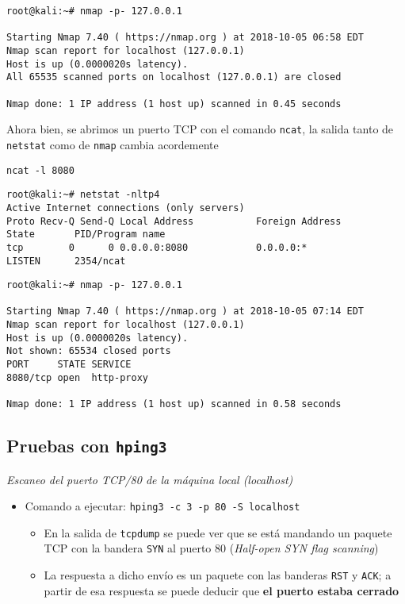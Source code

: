 \begin{lstlisting}[title={Escaneo de los 65535 puertos disponibles}]
root@kali:~# nmap -p- 127.0.0.1

Starting Nmap 7.40 ( https://nmap.org ) at 2018-10-05 06:58 EDT
Nmap scan report for localhost (127.0.0.1)
Host is up (0.0000020s latency).
All 65535 scanned ports on localhost (127.0.0.1) are closed

Nmap done: 1 IP address (1 host up) scanned in 0.45 seconds
\end{lstlisting}

Ahora bien, se abrimos un puerto TCP con el comando \texttt{ncat}, la salida tanto de \texttt{netstat} como de \texttt{nmap} cambia acordemente   

\begin{lstlisting}[title={Ponemos a escuchar al puerto 8080 por conexiones TCP}]
ncat -l 8080 
\end{lstlisting}

\begin{lstlisting}[title={\texttt{netstat} indica un puerto abierto}]
root@kali:~# netstat -nltp4
Active Internet connections (only servers)
Proto Recv-Q Send-Q Local Address           Foreign Address         State       PID/Program name    
tcp        0      0 0.0.0.0:8080            0.0.0.0:*               LISTEN      2354/ncat
\end{lstlisting}

\begin{lstlisting}[title={\texttt{nmap} indica 65534 puertos cerrados, y uno abierto}]
root@kali:~# nmap -p- 127.0.0.1

Starting Nmap 7.40 ( https://nmap.org ) at 2018-10-05 07:14 EDT
Nmap scan report for localhost (127.0.0.1)
Host is up (0.0000020s latency).
Not shown: 65534 closed ports
PORT     STATE SERVICE
8080/tcp open  http-proxy

Nmap done: 1 IP address (1 host up) scanned in 0.58 seconds
\end{lstlisting}


\subsection{Pruebas con \texttt{hping3}}

\emph{Escaneo del puerto TCP/80 de la máquina local (localhost)} 

\begin{itemize}
    \item Comando a ejecutar: \texttt{hping3 -c 3 -p 80 -S localhost} 
    \begin{itemize}
        \item En la salida de \texttt{tcpdump} se puede ver que se está mandando un paquete TCP con la bandera \texttt{SYN} al puerto 80 (\emph{Half-open SYN flag scanning})
        \item La respuesta a dicho envío es un paquete con las banderas \texttt{RST} y \texttt{ACK}; a partir de esa respuesta se puede deducir que \textbf{el puerto estaba cerrado}   
    \end{itemize}
\end{itemize}

